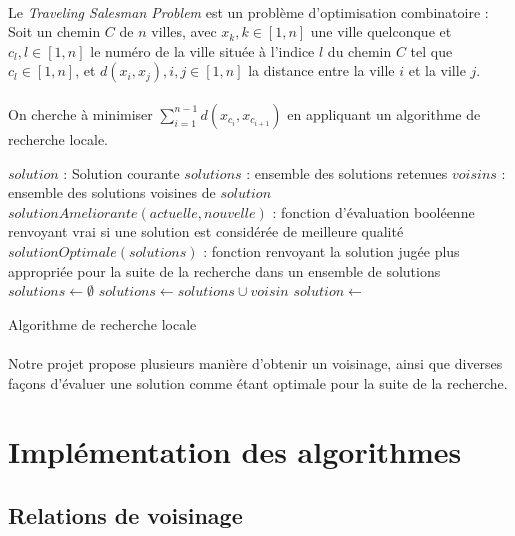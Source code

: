 \documentclass[a4paper,10pt]{report}
\begin{document}
\paragraph{}
  Le \textit{Traveling Salesman Problem} est un problème d'optimisation
combinatoire : Soit un chemin $C$ de $n$ villes, avec $x_k, k \in [1, n]$ une
ville quelconque et $c_l, l \in [1, n]$ le numéro de la ville située à l'indice
$l$ du chemin $C$ tel que $c_l \in [1,n]$, et $d(x_i,x_j), i,j \in [1,n]$ la
distance entre la ville $i$ et la ville $j$.
\paragraph{}
  On cherche à minimiser {\Large $\sum_{i=1}^{n - 1} d(x_{c_i},x_{c_{i+1}})$}
en appliquant un algorithme de recherche locale.

\begin{algorithm}
  \begin{algorithmic}
    \Require $solution$ : Solution courante
    \Require $solutions$ : ensemble des solutions retenues
    \Require $voisins$ : ensemble des solutions voisines de $solution$
    \Require $solutionAmeliorante(actuelle, nouvelle)$ : fonction d'évaluation
booléenne renvoyant vrai si une solution est considérée de meilleure qualité
    \Require $solutionOptimale(solutions)$ : fonction renvoyant la solution
jugée plus appropriée pour la suite de la recherche dans un ensemble de
solutions
    \State
    \State $solutions \gets \emptyset$
	\State $solutions \gets solutions \cup voisin$
      \EndIf
    \EndFor
    \State $solution \gets$ 
  \end{algorithmic}
  \caption{Algorithme de recherche locale}
\end{algorithm}

\paragraph{}
  Notre projet propose plusieurs manière d'obtenir un voisinage, ainsi que
diverses façons d'évaluer une solution comme étant optimale pour la suite de la
recherche.

\section{Implémentation des algorithmes}
\subsection{Relations de voisinage}
\end{document}
